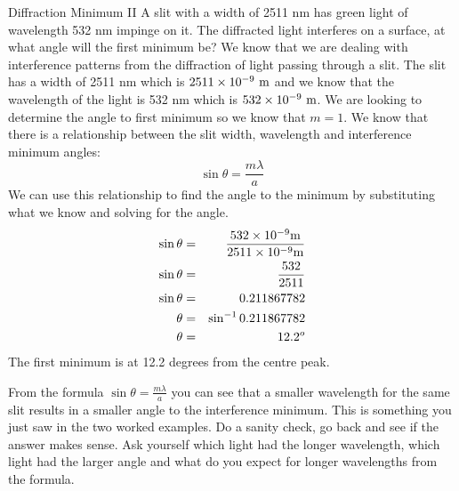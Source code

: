 \begin{wex}{Diffraction Minimum II}
{A slit with a width of 2511 nm has green light of wavelength 532 nm impinge on it. The diffracted light interferes on a surface, at what angle will the first minimum be? }
{
We know that we are dealing with interference patterns from the diffraction of light passing through a slit. The slit has a width of 2511 nm which is $2511 \times 10^{-9}\ \rm{m}$ and we know that the wavelength of the light is 532 nm which is $532 \times 10^{-9}\ \rm{m}$. We are looking to determine the angle to first minimum so we know that $m=1$.
We know that there is a relationship between the slit width, wavelength and interference minimum angles:
\begin{equation*}
\sin\theta = \frac{m\lambda}{a}
\end{equation*}
We can use this relationship to find the angle to the minimum by substituting what we know and solving for the angle.
\begin{eqnarray*}
\sin\theta &=& \frac{532\times 10^{-9}\rm{m}}{2511 \times 10^{-9}\rm{m}} \\
\sin\theta &=& \frac{532}{2511} \\
\sin\theta &=& 0.211867782  \\
\theta &=& \sin^{-1}0.211867782 \\
\theta &=& 12.2^o \\
\end{eqnarray*}
The first minimum is at 12.2 degrees from the centre peak.
}
\end{wex}

From the formula $\sin\theta = \frac{m\lambda}{a}$ you can see that a smaller wavelength for the same slit results in a smaller angle to the interference minimum. This is something you just saw in the two worked examples. Do a sanity check, go back and see if the answer makes sense. Ask yourself which light had the longer wavelength, which light had the larger angle and what do you expect for longer wavelengths from the formula.

